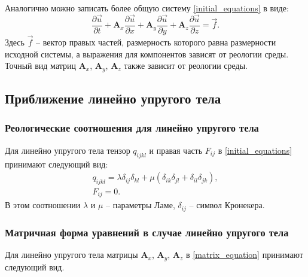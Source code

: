 Аналогично можно записать более общую систему \ref{initial_equations} в виде:
\begin{equation}
\label{matrix_equation}
\frac{\partial\vec{u}}{\partial{t}}+\mathbf{A}_x\frac{\partial\vec{u}}{\partial{x}}+
\mathbf{A}_y\frac{\partial\vec{u}}{\partial{y}}+
\mathbf{A}_z\frac{\partial\vec{u}}{\partial{z}}=\vec{f}.
\end{equation}
Здесь $\vec{f}$ -- вектор правых частей, размерность которого равна размерности исходной системы, а выражения для компонентов зависят от реологии среды. Точный вид матриц $\mathbf{A}_x$, $\mathbf{A}_y$, $\mathbf{A}_z$ также зависит от реологии среды.

\clearpage
\newpage

\subsection{Приближение линейно упругого тела}

\subsubsection{Реологические соотношения для линейно упругого тела}

Для линейно упругого тела тензор $q_{ijkl}$ и правая часть $F_{ij}$ в \ref{initial_equations} принимают следующий вид:
\begin{eqnarray}
\label{tensor_qijkl_elastic}
q_{ijkl}=\lambda\delta_{ij}\delta_{kl}+\mu(\delta_{ik}\delta_{jl}+\delta_{il}
\delta_{jk}),\nonumber\\
F_{ij}=0.
\end{eqnarray}
В этом соотношении $\lambda$ и $\mu$ -- параметры Ламе, $\delta_{ij}$ -- символ Кронекера.

\subsubsection{Матричная форма уравнений в случае линейно упругого тела}
\label{elastic_matrixes}

Для линейно упругого тела матрицы $\mathbf{A}_x$, $\mathbf{A}_y$, $\mathbf{A}_z$ в \ref{matrix_equation} принимают следующий вид.

